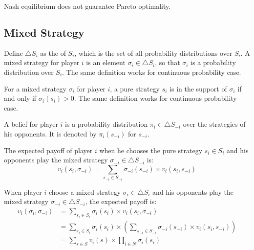 \begin{theorem}
    Nash equilibrium does not guarantee Pareto optimality.    
\end{theorem}





\subsection{Mixed Strategy}

\begin{definition}
    Define $\bigtriangleup S_i$ as the  of $S_i$, which is the set of all probability distributions over $S_i$. A mixed strategy for player $i$ is an element $\sigma_i \in \bigtriangleup S_i$, so that $\sigma_i$ is a probability distribution over $S_i$. The same definition works for continuous probability case.
\end{definition}

\begin{definition}
    For a mixed strategy $\sigma_i$ for player $i$, a pure strategy $s_i$ is in the support of $\sigma_i$ if and only if $\sigma_i (s_i) > 0$. The same definition works for continuous probability case.
\end{definition}

\begin{definition}
    A belief for player $i$ is a probability distribution $\pi_i \in \bigtriangleup S_{-i}$ over the strategies of his opponents. It is denoted by $\pi_i(s_{-i})$ for $s_{-i}$.
\end{definition}

\begin{definition}
    The expected payoff of player $i$ when he chooses the pure strategy $s_i \in S_i$ and his opponents play the mixed strategy $\sigma_{-i} \in \bigtriangleup S_{-i}$ is:
    \begin{equation*}
        v_i(s_i, \sigma_{-i}) = \sum_{s_{-i} \in S_{-i}} \sigma_{-i}(s_{-i}) \times v_i (s_i, s_{-i})
    \end{equation*}
    
    When player $i$ choose a mixed strategy $\sigma_i \in \bigtriangleup S_i$ and his opponents play the mixed strategy $\sigma_{-i} \in \bigtriangleup S_{-i}$, the expected payoff is:
    \begin{equation*}
    \begin{aligned}
        v_i(\sigma_i, \sigma_{-i}) &= \sum_{s_i \in S_i} \sigma_i (s_i) \times v_i(s_i, \sigma_{-i}) \\
        &= \sum_{s_i \in S_i} \sigma_i (s_i)  \times \left(\sum_{s_{-i} \in S_{-i}} \sigma_{-i} (s_{-i}) \times v_i (s_i, s_{-i}) \right) \\
        &= \sum_{s \in S} v_i(s) \times \prod_{i \in N} \sigma_i (s_i)
    \end{aligned}
            \end{equation*}
\end{definition}









